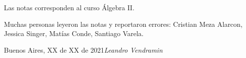 \preface

Las notas corresponden al curso Álgebra II. 

Muchas personas leyeron las notas y reportaron errores: 
Cristian Meza Alarcon, Jessica Singer, Matías Conde, Santiago Varela. 

\vspace{\baselineskip}
\begin{flushright}\noindent
Buenos Aires, XX de XX de 2021\hfill {\it Leandro Vendramin}\\
\end{flushright}
